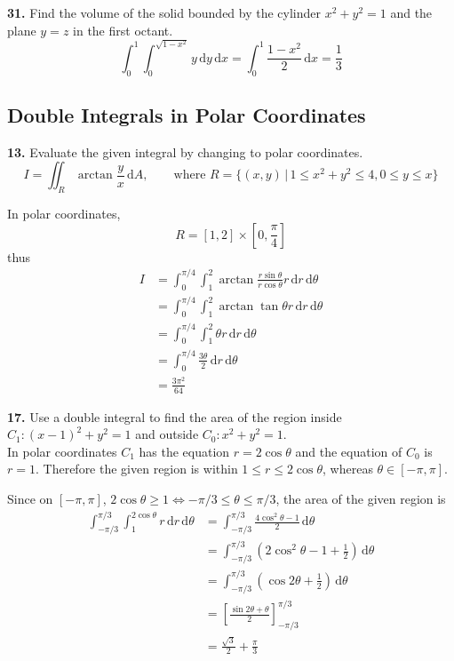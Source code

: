 \documentclass[a4paper,12pt]{article}
\newcommand{\ud}{\,\mathrm{d}}
\newcommand{\exercise}[1]{\noindent\textbf{#1.}}
\begin{document}
\exercise{31} Find the volume of the solid bounded by the cylinder
$x^2 + y^2 = 1$ and the plane $y = z$ in the first octant.
\[\int_0^1\int_0^{\sqrt{1-x^2}}y\ud y\ud x
= \int_0^1\frac{1 - x^2}{2}\ud x
= \frac{1}{3}\]

\subsection{Double Integrals in Polar Coordinates}
\exercise{13} Evaluate the given integral by changing to polar coordinates.
\[I = \iint_R\arctan\frac{y}{x}\ud A,\qquad
\text{where }R = \{(x, y)\,|\,1 \leq x^2 + y^2 \leq 4, 0 \leq y \leq x\}\]

In polar coordinates,
\[R = [1, 2]\times \left[0, \frac\pi 4\right]\]
thus
\begin{align*}
I &= \int_0^{\pi/4}\int_1^2\arctan\frac{r\sin\theta}{r\cos\theta}
     r\ud r\ud\theta\\
  &= \int_0^{\pi/4}\int_1^2\arctan\tan\theta r\ud r\ud\theta\\
  &= \int_0^{\pi/4}\int_1^2\theta r\ud r\ud\theta\\
  &= \int_0^{\pi/4}\frac{3\theta}{2}\ud r\ud\theta\\
  &= \frac{3\pi^2}{64}
\end{align*}


\begin{multicols*}{2}
  \noindent{}

  \exercise{17} Use a double integral to find the area of the region
  inside $C_1: (x - 1)^2 + y^2 = 1$ and outside $C_0: x^2 + y^2 = 1$.\\

  In polar coordinates $C_1$ has the equation $r = 2\cos\theta$ and
  the equation of $C_0$ is $r = 1$. Therefore the given region is within
  $1 \leq r \leq 2\cos\theta$, whereas $\theta \in [-\pi, \pi]$.
\end{multicols*}

Since on $[-\pi, \pi]$, $2\cos\theta \geq 1 \iff -\pi/3 \leq \theta \leq \pi/3$,
the area of the given region is
\begin{align*}
  \int_{-\pi/3}^{\pi/3}\int_1^{2\cos\theta}r\ud r\ud\theta
  &= \int_{-\pi/3}^{\pi/3}\frac{4\cos^2\theta - 1}{2}\ud\theta\\
  &= \int_{-\pi/3}^{\pi/3}\left(2\cos^2\theta - 1 + \frac{1}{2}\right)\ud\theta\\
  &= \int_{-\pi/3}^{\pi/3}\left(\cos 2\theta + \frac{1}{2}\right)\ud\theta\\
  &= \left[\frac{\sin 2\theta + \theta}{2}\right]_{-\pi/3}^{\pi/3}\\
  &= \frac{\sqrt 3}{2} + \frac\pi 3
\end{align*}
\end{document}
